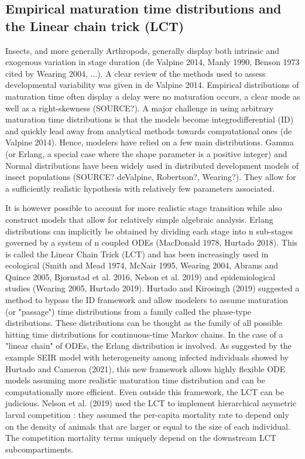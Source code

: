 \documentclass[12pt,a4paper,onecolumn]{article}
\begin{document}
\subsection{Empirical maturation time distributions and the Linear chain trick (LCT)}
\tabto{1 cm}  Insects, and more generally Arthropods, generally display both intrinsic and exogenous variation in stage duration (de Valpine 2014, Manly 1990, Benson 1973 cited by Wearing 2004, ...). A clear review of the methods used to assess developmental variability was given in de Valpine 2014.  Empirical distributions of maturation time often display a delay were no maturation occurs, a clear mode as well as a right-skewness (SOURCE?). A major challenge in using arbitrary maturation time distributions is that the models become integrodifferential (ID) and quickly lead away from analytical methods towards computational ones (de Valpine 2014). Hence, modelers have relied on a few main distributions. Gamma (or Erlang, a special case where the shape parameter is a positive integer) and Normal distributions have been widely used in distributed development models of insect populations (SOURCE? deValpine, Robertson?, Wearing?). They allow for a sufficiently realistic hypothesis with relatively few parameters associated. 

\tabto{1 cm} It is however possible to account for more realistic stage transition while also construct models that allow for relatively simple algebraic analysis. Erlang distributions can implicitly be obtained by dividing each stage into n sub-stages governed by a system of n coupled ODEs (MacDonald 1978, Hurtado 2018). This is called the Linear Chain Trick (LCT) and has been increasingly used in ecological (Smith and Mead 1974, McNair 1995, Wearing 2004, Abrams and Quince 2005, Bjornstad et al. 2016, Nelson et al. 2019) and epidemiological studies (Wearing 2005, Hurtado 2019). Hurtado and Kirosingh (2019) suggested a method to bypass the ID framework and allow modelers to assume maturation (or "passage") time distributions from a family called the phase-type distributions. These distributions can be thought as the family of all possible hitting time distributions for continuous-time Markov chains. In the case of a "linear chain" of ODEs, the Erlang distribution is involved. As suggested by the example SEIR model with heterogeneity among infected individuals showed by Hurtado and Cameron (2021), this new framework allows highly flexible ODE models assuming more realistic maturation time distribution and can be computationally more efficient. Even outside this framework, the LCT can be judicious. Nelson et al. (2019) used the LCT to implement hierarchical asymetric larval competition : they assumed the per-capita mortality rate to depend only on the density of animals that are larger or equal to the size of each individual. The competition mortality terms uniquely depend on the downstream LCT subcompartiments. 
\end{document}
